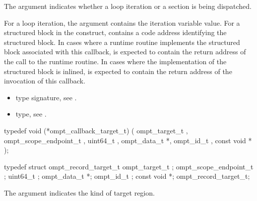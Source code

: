 The argument  indicates whether a loop iteration or a
section is being dispatched.

For a loop iteration, the argument  contains
the iteration variable value.  
For a structured block in the  construct, 
contains a code address identifying the structured block.  In cases where a
runtime routine implements the structured block associated with this callback,
 is expected to contain the return address of the
call to the runtime routine.  In cases where the implementation of
the structured block is inlined,  is expected to contain
the return address of the invocation of this callback.

\crossreferences
\begin{itemize}
\item {} type signature, see
  .
\item {} type, see
  .
\end{itemize}



\label{sec:ompt_callback_target_t}
\format

\begin{ccppspecific}
\begin{omptCallback}
typedef void (*ompt_callback_target_t) (
  ompt_target_t ,
  ompt_scope_endpoint_t ,
  uint64_t ,
  ompt_data_t *,
  ompt_id_t ,
  const void *
);
\end{omptCallback}
\end{ccppspecific}


\record

\begin{ccppspecific}
\begin{omptRecord}
typedef struct ompt_record_target_t {
  ompt_target_t ;
  ompt_scope_endpoint_t ;
  uint64_t ;
  ompt_data_t *;
  ompt_id_t ;
  const void *;
} ompt_record_target_t;
\end{omptRecord}
\end{ccppspecific}


\argdesc

The argument  indicates the kind of target region.

